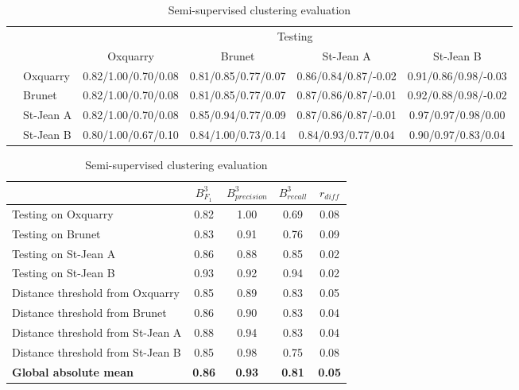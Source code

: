 \begin{table}
  \centering
  \caption{Semi-supervised clustering evaluation}
  \label{tab:semi_supervised_clustering}

  \label{tab:semi_supervised_clustering_train_test}
  \begin{tabular}{l l| c c c c}
    \toprule
    \multicolumn{2}{c}{\multirow{2}{*}{}} & \multicolumn{4}{c}{Testing} \\
    \multicolumn{2}{c}{} & Oxquarry & Brunet & St-Jean A & St-Jean B \\
    \midrule
    \parbox[t]{2mm}{}
    & Oxquarry
    & 0.82/1.00/0.70/0.08
    & 0.81/0.85/0.77/0.07
    & 0.86/0.84/0.87/-0.02
    & 0.91/0.86/0.98/-0.03
    \\
    & Brunet
    & 0.82/1.00/0.70/0.08
    & 0.81/0.85/0.77/0.07
    & 0.87/0.86/0.87/-0.01
    & 0.92/0.88/0.98/-0.02
    \\
    & St-Jean A
    & 0.82/1.00/0.70/0.08
    & 0.85/0.94/0.77/0.09
    & 0.87/0.86/0.87/-0.01
    & 0.97/0.97/0.98/0.00
    \\
    & St-Jean B
    & 0.80/1.00/0.67/0.10
    & 0.84/1.00/0.73/0.14
    & 0.84/0.93/0.77/0.04
    & 0.90/0.97/0.83/0.04
    \\
    \bottomrule
  \end{tabular}

  \vspace{0.5cm}

  \label{tab:semi_supervised_clustering_average}
  \begin{tabular}{l c c c c}
    \toprule
    & $B^{3}_{F_1}$
    & $B^{3}_{precision}$
    & $B^{3}_{recall}$
    & $r_{diff}$ \\
    \midrule
    Testing on Oxquarry               & 0.82 & 1.00 & 0.69 & 0.08 \\
    Testing on Brunet                 & 0.83 & 0.91 & 0.76 & 0.09 \\
    Testing on St-Jean A              & 0.86 & 0.88 & 0.85 & 0.02 \\
    Testing on St-Jean B              & 0.93 & 0.92 & 0.94 & 0.02 \\
    Distance threshold from Oxquarry  & 0.85 & 0.89 & 0.83 & 0.05 \\
    Distance threshold from Brunet    & 0.86 & 0.90 & 0.83 & 0.04 \\
    Distance threshold from St-Jean A & 0.88 & 0.94 & 0.83 & 0.04 \\
    Distance threshold from St-Jean B & 0.85 & 0.98 & 0.75 & 0.08 \\
    \textbf{Global absolute mean} & \textbf{0.86} & \textbf{0.93} & \textbf{0.81} & \textbf{0.05} \\
    \bottomrule
  \end{tabular}
\end{table}

